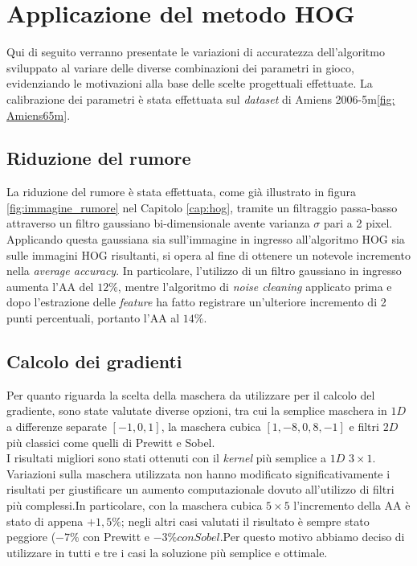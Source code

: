 %

\section{Applicazione del metodo HOG}
Qui di seguito verranno presentate le variazioni di accuratezza dell'algoritmo sviluppato al variare delle diverse combinazioni dei parametri in gioco, evidenziando le motivazioni alla base delle scelte progettuali effettuate. La calibrazione dei parametri è stata effettuata sul \emph{dataset} di Amiens 2006-5m\ref{fig: Amiens65m}. 

\subsection{Riduzione del rumore}
La riduzione del rumore è stata effettuata, come già illustrato in figura \ref{fig:immagine_rumore} nel Capitolo \ref{cap:hog}, tramite un filtraggio passa-basso attraverso un filtro gaussiano bi-dimensionale avente varianza $\sigma$ pari a 2 pixel. Applicando questa gaussiana sia sull'immagine in ingresso all'algoritmo HOG sia sulle immagini HOG risultanti, si opera al fine di ottenere un notevole incremento nella \emph{average accuracy}. In particolare, l'utilizzo di un filtro gaussiano in ingresso aumenta l'AA del $12\%$, mentre l'algoritmo di \emph{noise cleaning} applicato prima e dopo l'estrazione delle \emph{feature} ha fatto registrare un'ulteriore incremento di 2 punti percentuali, portanto l'AA al $14\%$.

\subsection{Calcolo dei gradienti}
Per quanto riguarda la scelta della maschera da utilizzare per il calcolo del gradiente, sono state valutate diverse opzioni, tra cui la semplice maschera in $1D$ a differenze separate $[-1, 0 ,1]$, la maschera cubica $[1,-8,0,8,-1]$ e filtri  $2D$ più classici come quelli di Prewitt e Sobel.\\
I risultati migliori sono stati ottenuti con il \emph{kernel} più semplice a $1D$ $3\times1$. Variazioni sulla maschera utilizzata non hanno modificato significativamente i risultati per giustificare un aumento computazionale dovuto all'utilizzo di filtri più complessi.In particolare, con la maschera cubica $5\times5$ l'incremento della AA è stato di appena $+1,5\%$; negli altri casi valutati il risultato è sempre stato peggiore ($-7\%$ con Prewitt e $-3\%con Sobel$.Per questo motivo abbiamo deciso di utilizzare in tutti e tre i casi la soluzione più semplice e ottimale.\\

